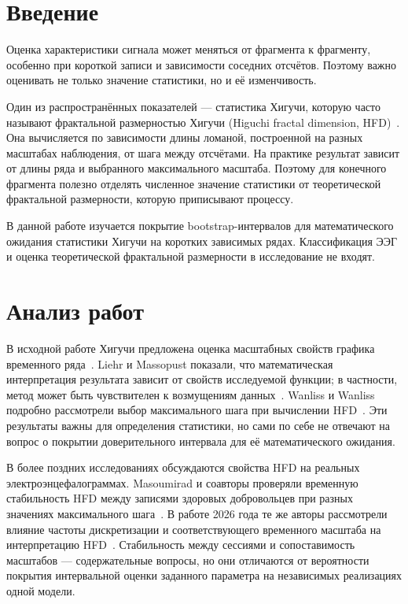 \section{Введение}

Оценка характеристики сигнала может меняться от фрагмента к фрагменту, особенно при короткой записи и зависимости соседних отсчётов. Поэтому важно оценивать не только значение статистики, но и её изменчивость.

Один из распространённых показателей --- статистика Хигучи, которую часто называют фрактальной размерностью Хигучи (Higuchi fractal dimension, HFD)~\cite{higuchi1988}. Она вычисляется по зависимости длины ломаной, построенной на разных масштабах наблюдения, от шага между отсчётами. На практике результат зависит от длины ряда и выбранного максимального масштаба. Поэтому для конечного фрагмента полезно отделять численное значение статистики от теоретической фрактальной размерности, которую приписывают процессу.

В данной работе изучается покрытие bootstrap-интервалов для математического ожидания статистики Хигучи на коротких зависимых рядах. Классификация ЭЭГ и оценка теоретической фрактальной размерности в исследование не входят.

\section{Анализ работ}

В исходной работе Хигучи предложена оценка масштабных свойств графика временного ряда~\cite{higuchi1988}. Liehr и Massopust показали, что математическая интерпретация результата зависит от свойств исследуемой функции; в частности, метод может быть чувствителен к возмущениям данных~\cite{liehr2020}. Wanliss и Wanliss подробно рассмотрели выбор максимального шага при вычислении HFD~\cite{wanliss2022}. Эти результаты важны для определения статистики, но сами по себе не отвечают на вопрос о покрытии доверительного интервала для её математического ожидания.

В более поздних исследованиях обсуждаются свойства HFD на реальных электроэнцефалограммах. Masoumirad и соавторы проверяли временную стабильность HFD между записями здоровых добровольцев при разных значениях максимального шага~\cite{masoumirad2025}. В работе 2026 года те же авторы рассмотрели влияние частоты дискретизации и соответствующего временного масштаба на интерпретацию HFD~\cite{masoumirad2026}. Стабильность между сессиями и сопоставимость масштабов --- содержательные вопросы, но они отличаются от вероятности покрытия интервальной оценки заданного параметра на независимых реализациях одной модели.

